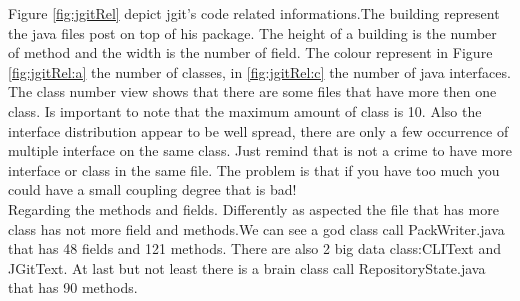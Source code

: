 \documentclass[]{usiinfbachelorproject}
\begin{document}
Figure \ref{fig:jgitRel} depict jgit's code related  informations.The building represent the java files post on top of his package. The height of a building is the number of method and the width is the number of field. The colour represent in Figure \ref{fig:jgitRel:a} the number of classes, in \ref{fig:jgitRel:c} the number of java interfaces.\\
The class number view shows that there are some files that have more then one class. Is important to note that the maximum amount of class is 10. Also the interface distribution appear to be well spread, there are only a few occurrence of multiple interface on the same class. Just remind that is not a crime to have more interface or class in the same file. The problem is that if you have too much you could have a small coupling degree that is bad! \\
Regarding the methods and  fields. Differently as aspected the file that has more class has not more field and methods.We can see a god class call PackWriter.java that has 48 fields and 121 methods. There are also 2 big data class:CLIText and JGitText. At last but not least there is a brain class call RepositoryState.java that has 90 methods.
 
\end{document}
